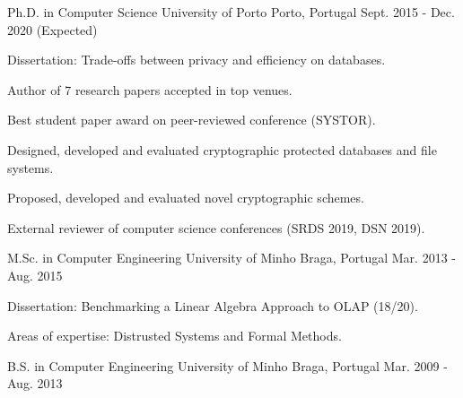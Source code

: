 

\begin{cventries}

  \cventry
    {Ph.D. in Computer Science} %
    {University of Porto} %
    {Porto, Portugal} %
    {Sept. 2015 - Dec. 2020 (Expected)} %
    {
      \begin{cvitems} %
        \item {Dissertation: Trade-offs between privacy and efficiency on databases.}
        \item {Author of 7 research papers accepted in top venues.}
        \item {Best student paper award on peer-reviewed conference (SYSTOR).}
        \item {Designed, developed and evaluated cryptographic protected databases and file systems.}
        \item {Proposed, developed and evaluated novel cryptographic schemes.}
        \item{External reviewer of computer science conferences (SRDS 2019, DSN 2019).}
      \end{cvitems}
    }


  \cventry
    {M.Sc. in Computer Engineering} %
    {University of Minho} %
    {Braga, Portugal} %
    {Mar. 2013 - Aug. 2015} %
    {
      \begin{cvitems} %
        \item {Dissertation: Benchmarking a Linear Algebra Approach to OLAP (18/20).}
        \item {Areas of expertise: Distrusted Systems and Formal Methods.}
      \end{cvitems}
    }


  \cventry
    {B.S. in Computer Engineering} %
    {University of Minho} %
    {Braga, Portugal} %
    {Mar. 2009 - Aug. 2013} %
    {
    }

\end{cventries}
